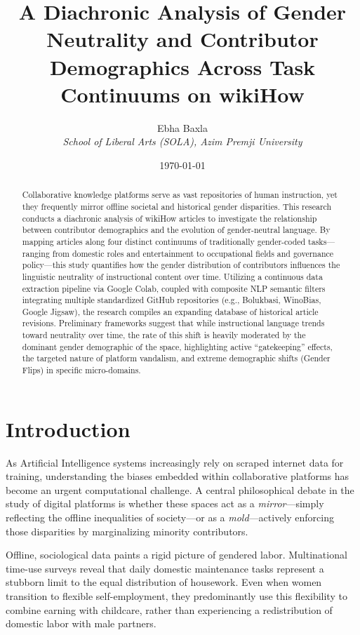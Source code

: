 \documentclass[11pt, a4paper]{article}
\title{\textbf{A Diachronic Analysis of Gender Neutrality and Contributor Demographics Across Task Continuums on wikiHow}}
\author{Ebha Baxla \\ \textit{School of Liberal Arts (SOLA), Azim Premji University}}
\date{\today}
\begin{document}
\maketitle

\begin{abstract}
Collaborative knowledge platforms serve as vast repositories of human instruction, yet they frequently mirror offline societal and historical gender disparities. This research conducts a diachronic analysis of wikiHow articles to investigate the relationship between contributor demographics and the evolution of gender-neutral language. By mapping articles along four distinct continuums of traditionally gender-coded tasks---ranging from domestic roles and entertainment to occupational fields and governance policy---this study quantifies how the gender distribution of contributors influences the linguistic neutrality of instructional content over time. Utilizing a continuous data extraction pipeline via Google Colab, coupled with composite NLP semantic filters integrating multiple standardized GitHub repositories (e.g., Bolukbasi, WinoBias, Google Jigsaw), the research compiles an expanding database of historical article revisions. Preliminary frameworks suggest that while instructional language trends toward neutrality over time, the rate of this shift is heavily moderated by the dominant gender demographic of the space, highlighting active ``gatekeeping'' effects, the targeted nature of platform vandalism, and extreme demographic shifts (Gender Flips) in specific micro-domains.
\end{abstract}

\vspace{0.5cm}

\section{Introduction}
As Artificial Intelligence systems increasingly rely on scraped internet data for training, understanding the biases embedded within collaborative platforms has become an urgent computational challenge. A central philosophical debate in the study of digital platforms is whether these spaces act as a \textit{mirror}---simply reflecting the offline inequalities of society---or as a \textit{mold}---actively enforcing those disparities by marginalizing minority contributors. 

Offline, sociological data paints a rigid picture of gendered labor. Multinational time-use surveys reveal that daily domestic maintenance tasks represent a stubborn limit to the equal distribution of housework. Even when women transition to flexible self-employment, they predominantly use this flexibility to combine earning with childcare, rather than experiencing a redistribution of domestic labor with male partners. 
\end{document}
